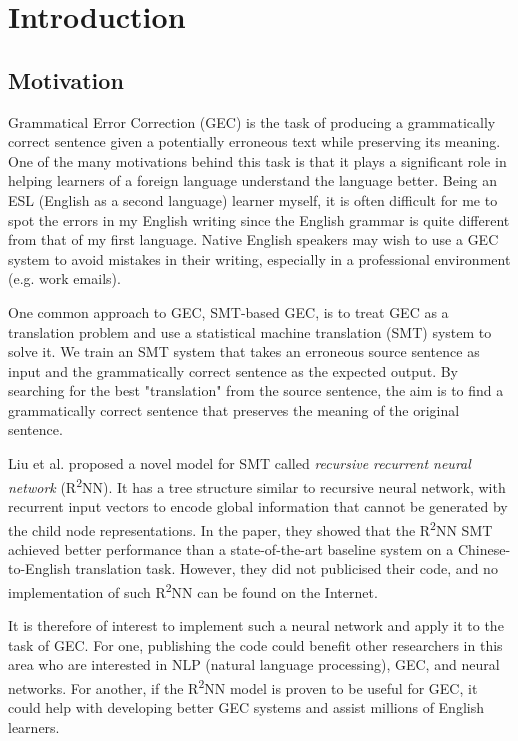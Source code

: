 \documentclass[12pt,a4paper,twoside,openright]{report}
\begin{document}
\pagestyle{headings}

\chapter{Introduction}

\section{Motivation}

Grammatical Error Correction (GEC) is the task of producing a grammatically correct sentence given a potentially erroneous text while preserving its meaning. One of the many motivations behind this task is that it plays a significant role in helping learners of a foreign language understand the language better. Being an ESL (English as a second language) learner myself, it is often difficult for me to spot the errors in my English writing since the English grammar is quite different from that of my first language. Native English speakers may wish to use a GEC system to avoid mistakes in their writing, especially in a professional environment (e.g. work emails). 

One common approach to GEC, SMT-based GEC, is to treat GEC as a translation problem and use a statistical machine translation (SMT) system to solve it. We train an SMT system that takes an erroneous source sentence as input and the grammatically correct sentence as the expected output. By searching for the best "translation" from the source sentence, the aim is to find a grammatically correct sentence that preserves the meaning of the original sentence.

Liu et al. proposed a novel model for SMT called \textit{recursive recurrent neural network} (R\textsuperscript{2}NN)\cite{r2nn}. It has a tree structure similar to recursive neural network, with recurrent input vectors to encode global information that cannot be generated by the child node representations. In the paper, they showed that the R\textsuperscript{2}NN SMT achieved better performance than a state-of-the-art baseline system on a Chinese-to-English translation task. However, they did not publicised their code, and no implementation of such R\textsuperscript{2}NN can be found on the Internet.

It is therefore of interest to implement such a neural network and apply it to the task of GEC. For one, publishing the code could benefit other researchers in this area who are interested in NLP (natural language processing), GEC, and neural networks. For another, if the R\textsuperscript{2}NN model is proven to be useful for GEC, it could help with developing better GEC systems and assist millions of English learners.
\end{document}
